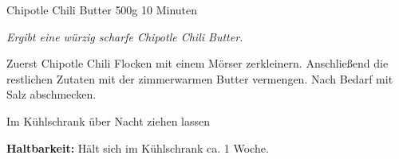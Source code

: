 \documentclass[
  DIV=11,%
  pagesize,%
  fontsize=11pt,%
  paper=a4,%
]{scrartcl}
\begin{document}
\begin{recipe}{Chipotle Chili Butter} {500g} {10 Minuten}

\freeform
\textit{Ergibt eine würzig scharfe Chipotle Chili Butter.}


Zuerst Chipotle Chili Flocken mit einem Mörser zerkleinern.
Anschließend die restlichen Zutaten mit der zimmerwarmen Butter vermengen.
Nach Bedarf mit Salz abschmecken.

\newstep
Im Kühlschrank über Nacht ziehen lassen

\freeform
\hrulefill

\freeform 
\textbf{Haltbarkeit:}
Hält sich im Kühlschrank ca. 1 Woche.

\end{recipe}
\end{document}
